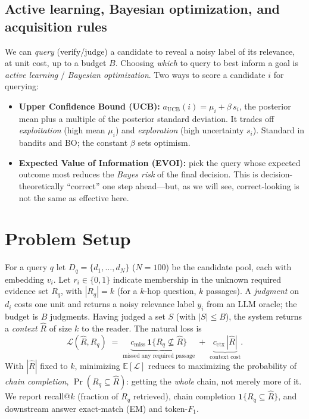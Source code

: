 \documentclass[11pt]{article}
\newcommand{\E}{\mathbb{E}}
\begin{document}
\subsection{Active learning, Bayesian optimization, and acquisition rules}\label{sec:bo}
We can \emph{query} (verify/judge) a candidate to reveal a noisy label of its relevance, at unit cost, up to a
budget $B$. Choosing \emph{which} to query to best inform a goal is \emph{active learning} / \emph{Bayesian
optimization}. Two ways to score a candidate $i$ for querying:
\begin{itemize}[leftmargin=*,itemsep=1pt]
  \item \textbf{Upper Confidence Bound (UCB):} $a_{\mathrm{UCB}}(i)=\mu_i+\beta\,s_i$, the posterior mean plus a
  multiple of the posterior standard deviation. It trades off \emph{exploitation} (high mean $\mu_i$) and
  \emph{exploration} (high uncertainty $s_i$). Standard in bandits and BO; the constant $\beta$ sets optimism.
  \item \textbf{Expected Value of Information (EVOI):} pick the query whose expected outcome most reduces the
  \emph{Bayes risk} of the final decision. This is decision-theoretically ``correct'' one step ahead---but, as
  we will see, correct-looking is not the same as effective here.
\end{itemize}

\section{Problem Setup}\label{sec:setup}
For a query $q$ let $D_q=\{d_1,\dots,d_N\}$ ($N{=}100$) be the candidate pool, each with embedding $v_i$. Let
$r_i\in\{0,1\}$ indicate membership in the unknown required evidence set $R_q$, with $|R_q|=k$ (for a $k$-hop
question, $k$ passages). A \emph{judgment} on $d_i$ costs one unit and returns a noisy relevance label $y_i$
from an LLM oracle; the budget is $B$ judgments. Having judged a set $S$ (with $|S|\le B$), the system returns a
\emph{context} $\widehat R$ of size $k$ to the reader. The natural loss is
\begin{equation}\label{eq:loss}
  \mathcal L(\widehat R, R_q) \;=\; \underbrace{c_{\text{miss}}\,\mathbf 1\{R_q\not\subseteq \widehat R\}}_{\text{missed any required passage}} \;+\; \underbrace{c_{\text{ctx}}\,|\widehat R|}_{\text{context cost}} .
\end{equation}
With $|\widehat R|$ fixed to $k$, minimizing $\E[\mathcal L]$ reduces to maximizing the probability of
\emph{chain completion}, $\Pr(R_q\subseteq\widehat R)$: getting the \emph{whole} chain, not merely more of it.
We report recall@$k$ (fraction of $R_q$ retrieved), chain completion $\mathbf 1\{R_q\subseteq\widehat R\}$, and
downstream answer exact-match (EM) and token-$F_1$.
\end{document}
